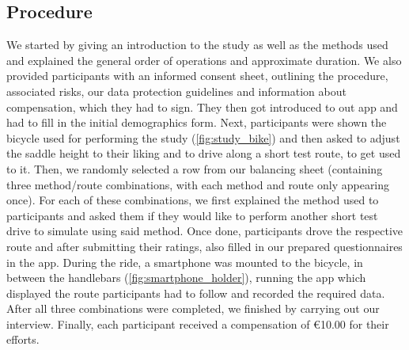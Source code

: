 \subsection{Procedure}

We started by giving an introduction to the study as well as the methods used and explained the general order of operations and approximate duration.
We also provided participants with an informed consent sheet, outlining the procedure, associated risks, our data protection guidelines and information about compensation, which they had to sign.
They then got introduced to out \likertshift app and had to fill in the initial demographics form.
Next, participants were shown the bicycle used for performing the study (\autoref{fig:study_bike}) and then asked to adjust the saddle height to their liking and to drive along a short test route, to get used to it.
Then, we randomly selected a row from our balancing sheet (containing three method/route combinations, with each method and route only appearing once).
For each of these combinations, we first explained the method used to participants and asked them if they would like to perform another short test drive to simulate using said method.
Once done, participants drove the respective route and after submitting their ratings, also filled in our prepared questionnaires in the \likertshift app.
During the ride, a smartphone was mounted to the bicycle, in between the handlebars (\autoref{fig:smartphone_holder}), running the \likertshift app which displayed the route participants had to follow and recorded the required data.
After all three combinations were completed, we finished by carrying out our interview.
Finally, each participant received a compensation of \euro10.00 for their efforts.

